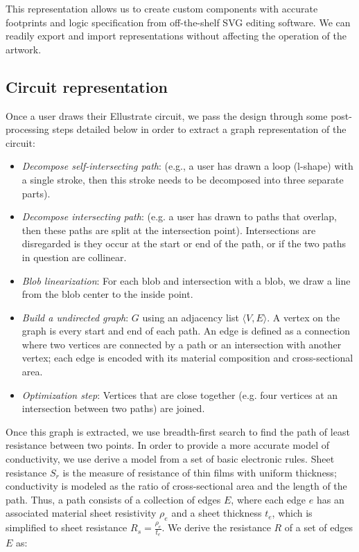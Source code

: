 \documentclass{sigchi}
\begin{document}
    This representation allows us to create custom components with accurate footprints and logic specification from off-the-shelf SVG editing software. We can readily export and import representations without affecting the operation of the artwork.

    \subsection{Circuit representation}

    Once a user draws their Ellustrate circuit, we pass the design through some post-processing steps detailed below in order to extract a graph representation of the circuit:
    \begin{itemize}
        \item \textit{Decompose self-intersecting path}:  (e.g., a user has drawn a loop (l-shape) with a single stroke, then this stroke needs to be decomposed into three separate parts).
        \item \textit{Decompose intersecting path}:  (e.g. a user has drawn to paths that overlap, then these paths are split at the intersection point). Intersections are disregarded is they occur at the start or end of the path, or if the two paths in question are collinear.
        \item \textit{Blob linearization}: For each blob and intersection with a blob, we draw a line from the blob center to the inside point.
        \item \textit{Build a undirected graph}: $G$ using an adjacency list $\langle V, E \rangle$. A vertex on the graph is every start and end of each path. An edge is defined as a connection where two vertices are connected by a path or an intersection with another vertex; each edge is encoded with its material composition and cross-sectional area.
        \item \textit{Optimization step}: Vertices that are close together (e.g. four vertices at an intersection between two paths) are joined.
    \end{itemize}
    Once this graph is extracted, we use breadth-first search to find the path of least resistance  between two points. In order to provide a more accurate model of conductivity, we use derive a model from a set of basic electronic rules. Sheet resistance $S_r$ is the measure of resistance of thin films with uniform thickness; conductivity is modeled as the ratio of cross-sectional area and the length of the path. Thus, a path consists of a collection of edges $E$, where each edge $e$ has an associated material sheet resistivity $\rho_e$ and a sheet thickness $t_e$, which is simplified to sheet resistance $R_s = \frac{\rho_e}{t_e}$. We derive the resistance $R$ of a set of edges $E$ as:
\end{document}
